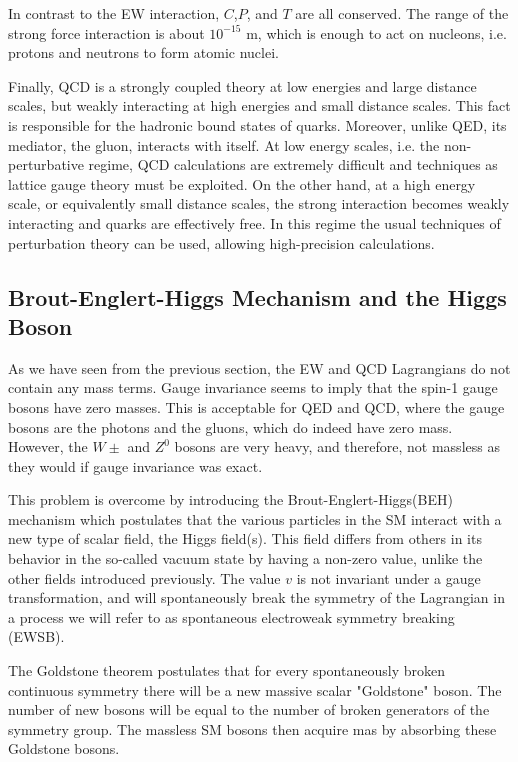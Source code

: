 In contrast to the EW interaction, $C$,$P$, and $T$ are all conserved. The range of the strong force interaction is about $10^{-15}$ m, which is enough to act on nucleons, i.e. protons and neutrons to form atomic nuclei.
	
Finally, QCD is a strongly coupled theory at low energies and large distance scales, but weakly interacting at high energies and small distance scales. This fact is responsible for the hadronic bound states of quarks. Moreover, unlike QED, its mediator, the gluon, interacts with itself.
At low energy scales, i.e. the non-perturbative regime, QCD calculations are extremely difficult and techniques as lattice gauge theory must be exploited.
On the other hand, at a high energy scale, or equivalently small distance scales, the strong interaction becomes weakly interacting and quarks are effectively free. In this regime the usual techniques of perturbation theory can be used, allowing high-precision calculations.

\subsection{Brout-Englert-Higgs Mechanism and the Higgs Boson}
	
As we have seen from the previous section, the EW and QCD Lagrangians do not contain any mass terms. Gauge invariance seems to imply that the spin-1 gauge bosons have zero masses. This is acceptable for QED and QCD, where the gauge bosons are the photons and the gluons, which do indeed have zero mass. However, the $W\pm$ and $Z^{0}$ bosons are very heavy, and therefore, not massless as they would if gauge invariance was exact.

This problem is overcome by introducing the Brout-Englert-Higgs(BEH) mechanism which postulates that the various particles in the SM interact with a new type of scalar field, the Higgs field(s). This field differs from others in its behavior in the so-called vacuum state by having a non-zero value, unlike the other fields introduced previously. The value $v$ is not invariant under a gauge transformation, and will spontaneously break the symmetry of the Lagrangian in a process we will refer to as spontaneous electroweak symmetry breaking (EWSB).

The Goldstone theorem postulates that for every spontaneously broken continuous symmetry there will be a new massive scalar "Goldstone" boson. The number of new bosons will be equal to the number of broken generators of the symmetry group. The massless SM bosons then acquire mas by absorbing these Goldstone bosons.
	
